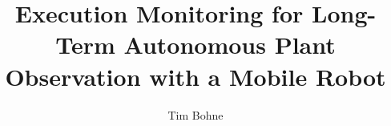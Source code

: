 \documentclass[english, master, utf8]{base/thesis_KBS}
\begin{document}
\setcounter{secnumdepth}{3}

\title{Execution Monitoring for Long-Term Autonomous Plant Observation with a Mobile Robot}
\author{Tim Bohne}

\generatetitle
\cleardoublepage

\cleardoublepage
\tableofcontents
\startTextChapters








\closing

\newpage\null\thispagestyle{empty}\newpage
\end{document}

